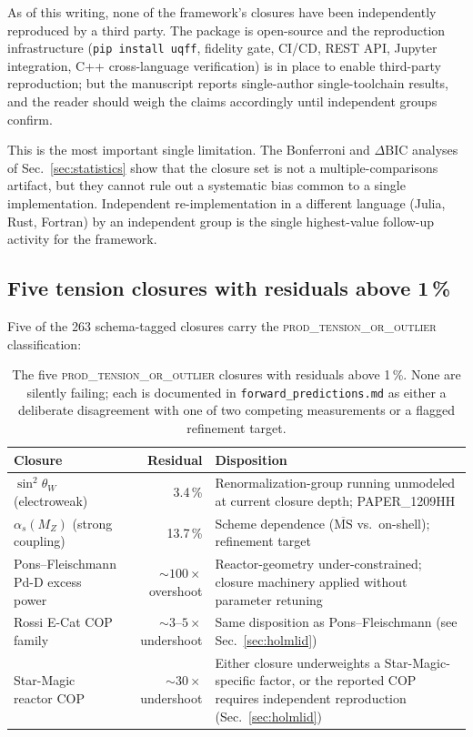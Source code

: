 As of this writing, none of the framework's closures have been
independently reproduced by a third party. The package is
open-source and the reproduction infrastructure
(\texttt{pip install uqff}, fidelity gate, CI/CD, REST API,
Jupyter integration, C++ cross-language verification) is in place
to enable third-party reproduction; but the manuscript reports
single-author single-toolchain results, and the reader should
weigh the claims accordingly until independent groups confirm.

This is the most important single limitation. The Bonferroni and
$\Delta\mathrm{BIC}$ analyses of Sec.~\ref{sec:statistics} show
that the closure set is not a multiple-comparisons artifact, but
they cannot rule out a systematic bias common to a single
implementation. Independent re-implementation in a different
language (Julia, Rust, Fortran) by an independent group is the
single highest-value follow-up activity for the framework.

\subsection{Five tension closures with residuals above 1\,\%}
\label{sec:lim_tensions}

Five of the 263 schema-tagged closures carry the
\textsc{prod\_tension\_or\_outlier} classification:

\begin{table}[H]
\centering
\caption{The five \textsc{prod\_tension\_or\_outlier} closures with
residuals above 1\,\%. None are silently failing; each is documented
in \texttt{forward\_predictions.md} as either a deliberate
disagreement with one of two competing measurements or a flagged
refinement target.}
\label{tab:tensions}
\begin{tabular}{l r p{6.5cm}}
\toprule
\textbf{Closure} & \textbf{Residual} & \textbf{Disposition} \\
\midrule
$\sin^2\theta_W$ (electroweak) & 3.4\,\% & Renormalization-group running unmodeled at current closure depth; PAPER\_1209HH \\
$\alpha_s(M_Z)$ (strong coupling) & 13.7\,\% & Scheme dependence ($\overline{\mathrm{MS}}$ vs.\ on-shell); refinement target \\
Pons--Fleischmann Pd-D excess power & $\sim 100\times$ overshoot & Reactor-geometry under-constrained; closure machinery applied without parameter retuning \\
Rossi E-Cat COP family & $\sim 3$--$5\times$ undershoot & Same disposition as Pons--Fleischmann (see Sec.~\ref{sec:holmlid}) \\
Star-Magic reactor COP & $\sim 30\times$ undershoot & Either closure underweights a Star-Magic-specific factor, or the reported COP requires independent reproduction (Sec.~\ref{sec:holmlid}) \\
\bottomrule
\end{tabular}
\end{table}

